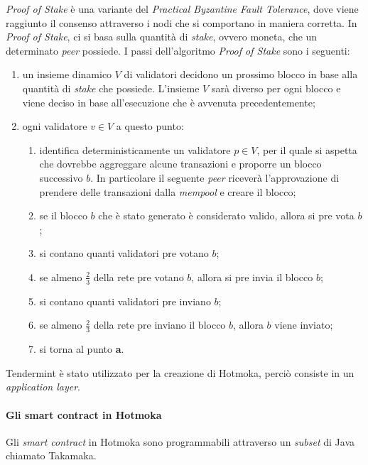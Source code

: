 \textit{Proof of Stake} è una variante del \textit{Practical Byzantine Fault Tolerance}, dove viene raggiunto il consenso attraverso i nodi che si comportano in maniera corretta. In \textit{Proof of Stake}, ci si basa sulla quantità di \textit{stake}, ovvero moneta, che un determinato \textit{peer} possiede. I passi dell'algoritmo \textit{Proof of Stake} sono i seguenti:
\begin{enumerate}[label=\lett]
  \item un insieme dinamico \( V \) di validatori decidono un prossimo blocco in base alla quantità di \textit{stake} che possiede. L'insieme \( V \) sarà diverso per ogni blocco e viene deciso in base all'esecuzione che è avvenuta precedentemente;
  \item ogni validatore \( v \in V \) a questo punto:
  \begin{enumerate}[label=\arabic*.]
    \item identifica deterministicamente un validatore \( p \in V \), per il quale si aspetta che dovrebbe aggreggare alcune transazioni e proporre un blocco successivo \( b \). In particolare il seguente \textit{peer} riceverà l'approvazione di prendere delle transazioni dalla \textit{mempool} e creare il blocco;
    \item se il blocco \( b \) che è stato generato è considerato valido, allora si pre vota \( b \);
    \item si contano quanti validatori pre votano \( b \);
    \item se almeno \( \frac{2}{3} \) della rete pre votano \( b \), allora si pre invia il blocco \( b \);
    \item si contano quanti validatori pre inviano \( b \);
    \item se almeno \( \frac{2}{3} \) della rete pre inviano il blocco \( b \), allora \( b \) viene inviato;
    \item si torna al punto \textbf{a}.
  \end{enumerate}
\end{enumerate}

Tendermint è stato utilizzato per la creazione di Hotmoka, perciò consiste in un \textit{application layer}.


\paragraph{Gli smart contract in Hotmoka}
Gli \textit{smart contract} in Hotmoka sono programmabili attraverso un \textit{subset} di Java chiamato Takamaka.


